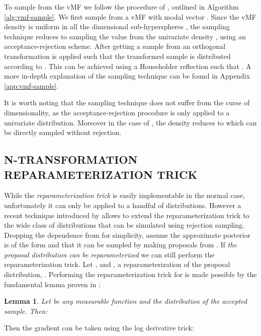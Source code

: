 \documentclass[letterpaper]{article}
\newtheorem{lem}{\textbf{Lemma}}
\begin{document}
To sample from the vMF we follow the procedure of \citet{sample-vmf}, outlined in Algorithm \ref{alg:vmf-sample}. We first sample from a vMF  with modal vector . Since the vMF density is uniform in all the  dimensional sub-hyperspheres , the sampling technique reduces to sampling the value  from the univariate density , using an acceptance-rejection scheme. After getting a sample from    an orthogonal transformation  is applied such that the transformed sample is distributed according to .
This can be achieved using a Householder reflection such that . A more in-depth explanation of the sampling technique can be found in Appendix \ref{app:vmf-sample}. 

It is worth noting that the sampling technique does not suffer from the curse of dimensionality, as the acceptance-rejection procedure is only applied to a univariate distribution. Moreover in the case of , the density  reduces to  which can be directly sampled without rejection.

\subsection{N-TRANSFORMATION REPARAMETERIZATION TRICK}\label{sec:reparameterization}

While the \textit{reparameterization trick} is easily implementable in the normal case, unfortunately it can only be applied to a handful of distributions. However a recent technique introduced by \cite{rejection-repar} allows to extend the reparameterization trick to the wide class of distributions that can be simulated using rejection sampling. Dropping the dependence from  for simplicity, assume the approximate posterior is of the form  and that it can be sampled by making proposals from . If {\it the proposal distribution can be reparameterized} we can still perform the reparameterization trick. Let , and , a reparameterization of the proposal distribution, . Performing the reparameterization trick for  is made possible by the fundamental lemma proven in \citep{rejection-repar}:
\begin{lem}\label{normal-repar}
Let  be any measurable function and  the distribution of the accepted sample.  Then:

\end{lem}
Then the gradient can be taken using the log derivative trick:
\end{document}
